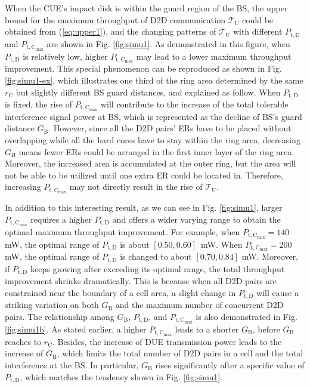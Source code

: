 \documentclass[journal, 10pt]{IEEEtran}
\begin{document}
When the CUE's impact disk is within the guard region of the BS, the
upper bound for the maximum throughput of D2D communication
$\mathcal{T}_\mathrm{U}$ could be obtained from (\ref{eq:upper1}), and
the changing patterns of $\mathcal{T}_\mathrm{U}$ with different
$P_\mathrm{t,D}$ and $P_\mathrm{t,C_{max}}$ are shown in Fig.
\ref{fig:simu1}. As demonstrated in this figure, when $P_\mathrm{t,D}$
is relatively low, higher $P_\mathrm{t,C_{max}}$ may lead to a lower
maximum throughput improvement. This special phenomenon can be
reproduced as shown in Fig. \ref{fig:simu1-ex}, which illustrates one
third of the ring area determined by the same $r_\mathrm{C}$ but
slightly different BS guard distances, and explained as follow. When
$P_\mathrm{t, D}$ is fixed, the rise of $P_\mathrm{t,C_{\max}}$ will
contribute to the increase of the total tolerable interference signal
power at BS, which is represented as the decline of BS's guard
distance $G_\mathrm{B}$. However, since all the D2D pairs' ERs have to
be placed without overlapping while all the hard cores have to stay
within the ring area, decreasing $G_\mathrm{B}$ means fewer ERs could
be arranged in the first inner layer of the ring area. Moreover, the
increased area is accumulated at the outer ring, but the area will not
be able to be utilized until one extra ER could be located in.
Therefore, increasing $P_\mathrm{t, C_{\max}}$ may not directly result
in the rise of $\mathcal{T}_\mathrm{U}$.  

In addition to this interesting result, as we can see in Fig.
\ref{fig:simu1}, larger $P_\mathrm{t,C_{max}}$ requires a higher
$P_\mathrm{t,D}$ and offers a wider varying range to obtain the
optimal maximum throughput improvement. For example, when
$P_\mathrm{t, C_{\max}} = 140$ mW, the optimal range of
$P_\mathrm{t,D}$ is about $[0.50, 0.60]$~mW. When $P_\mathrm{t,
C_{\max}} = 200$mW, the optimal range of $P_\mathrm{t,D}$ is changed
to about $[0.70, 0.84]$ mW. Moreover, if $P_\mathrm{t,D}$ keeps
growing after exceeding its optimal range, the total throughput
improvement shrinks dramatically. This is because when all D2D pairs
are constrained near the boundary of a cell area, a slight change in
$P_\mathrm{t,D}$ will cause a striking variation on both
$G_\mathrm{B}$ and the maximum number of concurrent D2D pairs. The
relationship among $G_\mathrm{B}$, $P_\mathrm{t,D}$, and
$P_\mathrm{t,C_{max}}$ is also demonstrated in Fig. \ref{fig:simu1b}.
As stated earlier, a higher $P_\mathrm{t, C_{max}}$ leads to a shorter
$G_\mathrm{B}$, before $G_\mathrm{B}$ reaches to $r_\mathrm{C}$.
Besides, the increase of DUE transmission power leads to the increase
of $G_\mathrm{B}$, which limits the total number of D2D pairs in a
cell and the total interference at the BS. In particular,
$G_\mathrm{B}$ rises significantly after a specific value of
$P_\mathrm{t,D}$, which matches the tendency shown in Fig.
\ref{fig:simu1}.
\end{document}

